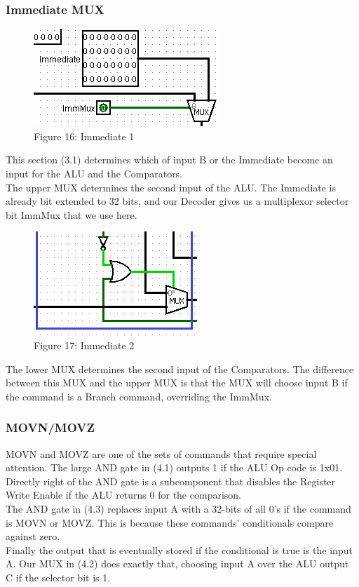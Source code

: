 \documentclass{article}
\begin{document}
\subsubsection{Immediate MUX}
\begin{figure}
\vspace{-1.8cm}
\begin{center}
\includegraphics[width=.3\textwidth]{Immediate.png}\\
Figure 16: Immediate 1
\end{center}
\vspace{-1cm}
\end{figure}
This section (3.1) determines which of input B or the Immediate become an input for the ALU and the Comparators.\\
The upper MUX determines the second input of the ALU. The Immediate is already bit extended to 32 bits, and our Decoder gives us a multiplexor selector bit ImmMux that we use here. \\

\begin{figure}
\vspace{-1cm}
\begin{center}
\includegraphics[width=.28\textwidth]{Immediate2.png} \\
Figure 17: Immediate 2
\end{center}
\vspace{-3cm}
\end{figure}
\noindent The lower MUX determines the second input of the Comparators. The difference between this MUX and the upper MUX is that the MUX will choose input B if the command is a Branch command, overriding the ImmMux. 

\newpage
\subsubsection{MOVN/MOVZ}
MOVN and MOVZ are one of the sets of commands that require special attention. The large AND gate in (4.1) outputs 1 if the ALU Op code is 1x01. Directly right of the AND gate is a subcomponent that disables the Register Write Enable if the ALU returns 0 for the comparison. \\
The AND gate in (4.3) replaces input A with a 32-bits of all 0's if the command is MOVN or MOVZ. This is because these commands' conditionals compare against zero. \\
Finally the output that is eventually stored if the conditional is true is the input A. Our MUX in (4.2) does exactly that, choosing input A over the ALU output C if the selector bit is 1.
\end{document}
